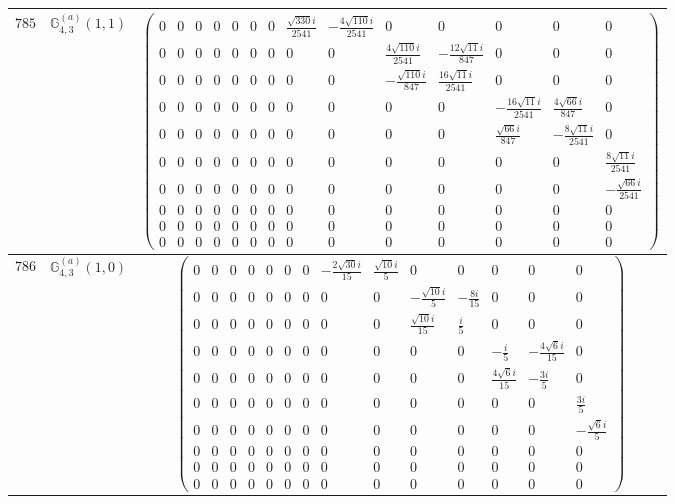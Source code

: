 \documentclass[fleqn,8pt,landscape]{jsarticle}
\begin{document}
\begin{center}
\begin{longtable}{ccc}
$ 785 $ & $ \mathbb{G}_{4,3}^{(a)}(1,1) $ & $ \begin{pmatrix} 0 & 0 & 0 & 0 & 0 & 0 & 0 & \frac{\sqrt{330} i}{2541} & - \frac{4 \sqrt{110} i}{2541} & 0 & 0 & 0 & 0 & 0 \\ 0 & 0 & 0 & 0 & 0 & 0 & 0 & 0 & 0 & \frac{4 \sqrt{110} i}{2541} & - \frac{12 \sqrt{11} i}{847} & 0 & 0 & 0 \\ 0 & 0 & 0 & 0 & 0 & 0 & 0 & 0 & 0 & - \frac{\sqrt{110} i}{847} & \frac{16 \sqrt{11} i}{2541} & 0 & 0 & 0 \\ 0 & 0 & 0 & 0 & 0 & 0 & 0 & 0 & 0 & 0 & 0 & - \frac{16 \sqrt{11} i}{2541} & \frac{4 \sqrt{66} i}{847} & 0 \\ 0 & 0 & 0 & 0 & 0 & 0 & 0 & 0 & 0 & 0 & 0 & \frac{\sqrt{66} i}{847} & - \frac{8 \sqrt{11} i}{2541} & 0 \\ 0 & 0 & 0 & 0 & 0 & 0 & 0 & 0 & 0 & 0 & 0 & 0 & 0 & \frac{8 \sqrt{11} i}{2541} \\ 0 & 0 & 0 & 0 & 0 & 0 & 0 & 0 & 0 & 0 & 0 & 0 & 0 & - \frac{\sqrt{66} i}{2541} \\ 0 & 0 & 0 & 0 & 0 & 0 & 0 & 0 & 0 & 0 & 0 & 0 & 0 & 0 \\ 0 & 0 & 0 & 0 & 0 & 0 & 0 & 0 & 0 & 0 & 0 & 0 & 0 & 0 \\ 0 & 0 & 0 & 0 & 0 & 0 & 0 & 0 & 0 & 0 & 0 & 0 & 0 & 0 \end{pmatrix} $ \\ \hline
$ 786 $ & $ \mathbb{G}_{4,3}^{(a)}(1,0) $ & $ \begin{pmatrix} 0 & 0 & 0 & 0 & 0 & 0 & 0 & - \frac{2 \sqrt{30} i}{15} & \frac{\sqrt{10} i}{5} & 0 & 0 & 0 & 0 & 0 \\ 0 & 0 & 0 & 0 & 0 & 0 & 0 & 0 & 0 & - \frac{\sqrt{10} i}{5} & - \frac{8 i}{15} & 0 & 0 & 0 \\ 0 & 0 & 0 & 0 & 0 & 0 & 0 & 0 & 0 & \frac{\sqrt{10} i}{15} & \frac{i}{5} & 0 & 0 & 0 \\ 0 & 0 & 0 & 0 & 0 & 0 & 0 & 0 & 0 & 0 & 0 & - \frac{i}{5} & - \frac{4 \sqrt{6} i}{15} & 0 \\ 0 & 0 & 0 & 0 & 0 & 0 & 0 & 0 & 0 & 0 & 0 & \frac{4 \sqrt{6} i}{15} & - \frac{3 i}{5} & 0 \\ 0 & 0 & 0 & 0 & 0 & 0 & 0 & 0 & 0 & 0 & 0 & 0 & 0 & \frac{3 i}{5} \\ 0 & 0 & 0 & 0 & 0 & 0 & 0 & 0 & 0 & 0 & 0 & 0 & 0 & - \frac{\sqrt{6} i}{5} \\ 0 & 0 & 0 & 0 & 0 & 0 & 0 & 0 & 0 & 0 & 0 & 0 & 0 & 0 \\ 0 & 0 & 0 & 0 & 0 & 0 & 0 & 0 & 0 & 0 & 0 & 0 & 0 & 0 \\ 0 & 0 & 0 & 0 & 0 & 0 & 0 & 0 & 0 & 0 & 0 & 0 & 0 & 0 \end{pmatrix} $ \\ \hline

\end{longtable}
\end{center}
\end{document}
